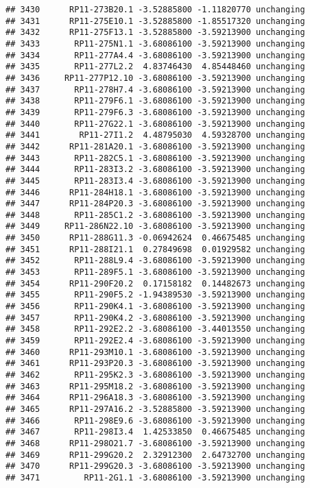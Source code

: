 \documentclass[]{article}
\begin{document}
\begin{verbatim}
## 3430      RP11-273B20.1 -3.52885800 -1.11820770 unchanging
## 3431      RP11-275E10.1 -3.52885800 -1.85517320 unchanging
## 3432      RP11-275F13.1 -3.52885800 -3.59213900 unchanging
## 3433       RP11-275N1.1 -3.68086100 -3.59213900 unchanging
## 3434       RP11-277A4.4 -3.68086100 -3.59213900 unchanging
## 3435       RP11-277L2.2  4.83746430  4.85448460 unchanging
## 3436     RP11-277P12.10 -3.68086100 -3.59213900 unchanging
## 3437       RP11-278H7.4 -3.68086100 -3.59213900 unchanging
## 3438       RP11-279F6.1 -3.68086100 -3.59213900 unchanging
## 3439       RP11-279F6.3 -3.68086100 -3.59213900 unchanging
## 3440       RP11-27G22.1 -3.68086100 -3.59213900 unchanging
## 3441        RP11-27I1.2  4.48795030  4.59328700 unchanging
## 3442      RP11-281A20.1 -3.68086100 -3.59213900 unchanging
## 3443       RP11-282C5.1 -3.68086100 -3.59213900 unchanging
## 3444       RP11-283I3.2 -3.68086100 -3.59213900 unchanging
## 3445       RP11-283I3.4 -3.68086100 -3.59213900 unchanging
## 3446      RP11-284H18.1 -3.68086100 -3.59213900 unchanging
## 3447      RP11-284P20.3 -3.68086100 -3.59213900 unchanging
## 3448       RP11-285C1.2 -3.68086100 -3.59213900 unchanging
## 3449     RP11-286N22.10 -3.68086100 -3.59213900 unchanging
## 3450      RP11-288G11.3 -0.06942624  0.46675485 unchanging
## 3451      RP11-288I21.1  0.27849698  0.01929582 unchanging
## 3452       RP11-288L9.4 -3.68086100 -3.59213900 unchanging
## 3453       RP11-289F5.1 -3.68086100 -3.59213900 unchanging
## 3454      RP11-290F20.2  0.17158182  0.14482673 unchanging
## 3455       RP11-290F5.2 -1.94389530 -3.59213900 unchanging
## 3456       RP11-290K4.1 -3.68086100 -3.59213900 unchanging
## 3457       RP11-290K4.2 -3.68086100 -3.59213900 unchanging
## 3458       RP11-292E2.2 -3.68086100 -3.44013550 unchanging
## 3459       RP11-292E2.4 -3.68086100 -3.59213900 unchanging
## 3460      RP11-293M10.1 -3.68086100 -3.59213900 unchanging
## 3461      RP11-293P20.3 -3.68086100 -3.59213900 unchanging
## 3462       RP11-295K2.3 -3.68086100 -3.59213900 unchanging
## 3463      RP11-295M18.2 -3.68086100 -3.59213900 unchanging
## 3464      RP11-296A18.3 -3.68086100 -3.59213900 unchanging
## 3465      RP11-297A16.2 -3.52885800 -3.59213900 unchanging
## 3466       RP11-298E9.6 -3.68086100 -3.59213900 unchanging
## 3467       RP11-298I3.4  1.42533850  0.46675485 unchanging
## 3468      RP11-298O21.7 -3.68086100 -3.59213900 unchanging
## 3469      RP11-299G20.2  2.32912300  2.64732700 unchanging
## 3470      RP11-299G20.3 -3.68086100 -3.59213900 unchanging
## 3471         RP11-2G1.1 -3.68086100 -3.59213900 unchanging

\end{verbatim}
\end{document}
